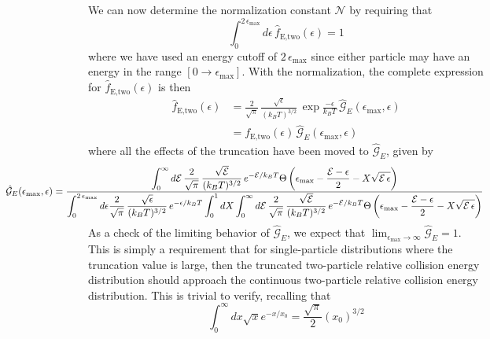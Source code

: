 We can now determine the normalization constant $\mathcal{N}$ by requiring that
\begin{equation*}
	\int_0^{2 \, \epsilon_\text{max}} d \epsilon \, \hat{f}_\text{E,two}(\epsilon) = 1
\end{equation*}
where we have used an energy cutoff of $2 \, \epsilon_\text{max}$ since either particle may have an energy in the range $[0 \rightarrow \epsilon_\text{max}]$. 
With the normalization, the complete expression for $\hat{f}_\text{E,two}(\epsilon)$ is then
\begin{equation} \label{eq:truncRelDist}
\begin{split}
	\hat{f}_\text{E,two}(\epsilon) &= \frac{2}{\sqrt{\pi}} \, \frac{\sqrt{\epsilon}}{(k_B T)^{3/2}} \, \exp{\frac{-\epsilon}{k_B T}} \, \hat{\mathcal{G}}_E(\epsilon_\text{max}, \epsilon) \\
	 &= f_\text{E,two}(\epsilon)\,\hat{\mathcal{G}}_E(\epsilon_\text{max}, \epsilon)
\end{split}
\end{equation}
where all the effects of the truncation have been moved to $\hat{\mathcal{G}}_E$, given by 
\begin{equation} \label{eq:truncWeighting}
\hspace*{-3cm} 
	\hat{\mathcal{G}}_E(\epsilon_\text{max}, \epsilon) = \frac{\displaystyle
	\int_0^\infty d \mathcal{E} \, \frac{2}{\sqrt{\pi}} \, \frac{\sqrt{\mathcal{E}}}{(k_B T)^{3/2}} \, e^{-\mathcal{E} / k_B T} \heaviside{\epsilon_\text{max} - \frac{\mathcal{E} - \epsilon}{2} - X \sqrt{\mathcal{E} \,  \epsilon}}}
	{\displaystyle \int_0^{2\,\epsilon_\text{max}} d \epsilon \frac{2}{\sqrt{\pi}} \, \frac{\sqrt{\epsilon}}{(k_B T)^{3/2}} \, e^{-\epsilon/k_B T} \int_0^1 dX \int_0^\infty d \mathcal{E} \, \frac{2}{\sqrt{\pi}} \, \frac{\sqrt{\mathcal{E}}}{(k_B T)^{3/2}} \, e^{-\mathcal{E} / k_B T} \heaviside{\epsilon_\text{max} - \frac{\mathcal{E} - \epsilon}{2} - X \sqrt{\mathcal{E} \,  \epsilon}}}
\end{equation}
As a check of the limiting behavior of $\hat{\mathcal{G}}_E$, we expect that $ \displaystyle \lim_{\epsilon_\text{max} \rightarrow \infty} \hat{\mathcal{G}}_E = 1$.
This is simply a requirement that for single-particle distributions where the truncation value is large, then the truncated two-particle relative collision energy distribution should approach the continuous two-particle relative collision energy distribution. 
This is trivial to verify, recalling that 
\begin{equation}
	\int_0^{\infty} dx \sqrt{x} e^{-x/x_0} = \frac{\sqrt{\pi}}{2} (x_0)^{3/2}
\end{equation}

